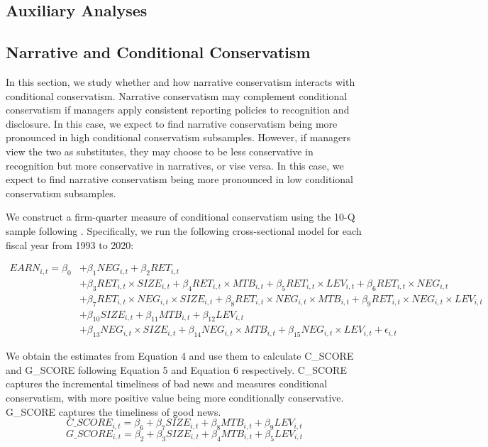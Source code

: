 \documentclass[a4paper]{article}
\begin{document}
\begin{spacing}{2}
\section{Auxiliary Analyses}
\subsection{Narrative and Conditional Conservatism}
In this section, we study whether and how narrative conservatism interacts with conditional conservatism. Narrative conservatism may complement conditional conservatism if managers apply consistent reporting policies to recognition and disclosure. In this case, we expect to find narrative conservatism being more pronounced in high conditional conservatism subsamples. However, if managers view the two as substitutes, they may choose to be less conservative in recognition but more conservative in narratives, or vise versa. In this case, we expect to find narrative conservatism being more pronounced in low conditional conservatism subsamples. 

We construct a firm-quarter measure of conditional conservatism using the 10-Q sample following . Specifically, we run the following cross-sectional model for each fiscal year from 1993 to 2020:

\begin{equation} \label{eq4}
\begin{split}
EARN_{i,t} = \beta_0&+\beta_1NEG_{i,t}+\beta_2RET_{i,t}\\
&+\beta_3RET_{i,t}\times SIZE_{i,t}+\beta_4RET_{i,t}\times MTB_{i,t}+\beta_5RET_{i,t}\times LEV_{i,t}+\beta_6RET_{i,t}\times NEG_{i,t}\\
&+\beta_7RET_{i,t}\times NEG_{i,t}\times SIZE_{i,t}+\beta_8RET_{i,t}\times NEG_{i,t}\times MTB_{i,t}+\beta_9RET_{i,t}\times NEG_{i,t}\times LEV_{i,t}\\
&+\beta_{10}SIZE_{i,t}+\beta_{11}MTB_{i,t}+\beta_{12}LEV_{i,t}\\
&+\beta_{13}NEG_{i,t}\times SIZE_{i,t}+\beta_{14}NEG_{i,t}\times MTB_{i,t}+\beta_{15}NEG_{i,t}\times LEV_{i,t}+ \epsilon_{i,t}
\end{split}
\end{equation}

We obtain the estimates from Equation 4 and use them to calculate C\_SCORE and G\_SCORE following Equation 5 and Equation 6 respectively. C\_SCORE captures the incremental timeliness of bad news and measures conditional conservatism, with more positive value being more conditionally conservative. G\_SCORE captures the timeliness of good news.
\begin{equation}\label{eq5}
C\_SCORE_{i,t} = \beta_6+\beta_7SIZE_{i,t}+\beta_8MTB_{i,t}+\beta_9LEV_{i,t}
\end{equation}
\begin{equation}\label{eq6}
G\_SCORE_{i,t} = \beta_2+\beta_3SIZE_{i,t}+\beta_4MTB_{i,t}+\beta_5LEV_{i,t}
\end{equation}


\end{spacing}
\end{document}
